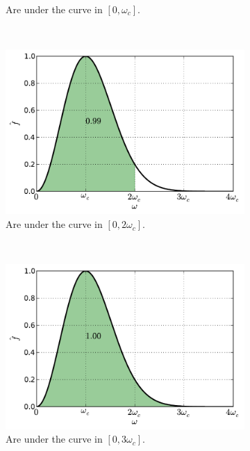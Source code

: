 \documentclass[12pt,letterpaper,landscape]{article}
\begin{document}
{\begin{figure}[h]
\begin{subfigure}[b]{0.45\textwidth}
        \caption{Are under the curve in $[0,\omega_c]$.}
    \end{subfigure}\
    \begin{subfigure}[b]{0.45\textwidth}
        \includegraphics[width=\textwidth]{img/ricker_area=2.pdf}
        \caption{Are under the curve in $[0,2\omega_c]$.}
    \end{subfigure}\\
    \begin{subfigure}[b]{0.45\textwidth}
        \includegraphics[width=\textwidth]{img/ricker_area=3.pdf}
        \caption{Are under the curve in $[0,3\omega_c]$.}
    \end{subfigure}
    \begin{subfigure}[b]{0.45\textwidth}

\end{subfigure}
\end{figure}}
\end{document}
